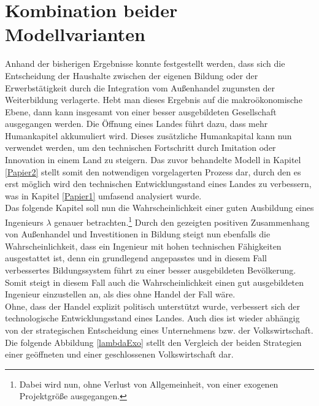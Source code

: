 \chapter{Kombination beider Modellvarianten}\label{Kombi}
Anhand der bisherigen Ergebnisse konnte festgestellt werden, dass sich die Entscheidung
der Haushalte zwischen der eigenen Bildung oder der Erwerbstätigkeit durch die Integration vom Außenhandel zugunsten der Weiterbildung verlagerte. Hebt man dieses Ergebnis auf die makroökonomische Ebene, dann kann insgesamt von einer besser ausgebildeten Gesellschaft ausgegangen werden. Die Öffnung eines Landes führt dazu, dass mehr Humankapitel akkumuliert wird. Dieses zusätzliche Humankapital kann nun verwendet werden, um den technischen Fortschritt durch Imitation oder Innovation in einem Land zu steigern. Das zuvor behandelte Modell in Kapitel \ref{Papier2} stellt somit den notwendigen vorgelagerten Prozess dar, durch den es erst möglich wird den technischen Entwicklungsstand eines Landes zu verbessern, was in Kapitel \ref{Papier1} umfasend analysiert wurde.\\
%
Das folgende Kapitel soll nun die Wahrscheinlichkeit einer guten Ausbildung eines Ingenieurs $\lambda$ genauer betrachten.\footnote{Dabei wird nun, ohne Verlust von Allgemeinheit, von einer exogenen Projektgröße ausgegangen.} Durch den gezeigten positiven Zusammenhang von Außenhandel und Investitionen in Bildung steigt nun ebenfalls die Wahrscheinlichkeit, dass ein Ingenieur mit hohen technischen Fähigkeiten ausgestattet ist, denn ein grundlegend angepasstes und in diesem Fall verbessertes Bildungssystem führt zu einer besser ausgebildeten Bevölkerung. Somit steigt in diesem Fall auch die Wahrscheinlichkeit einen gut ausgebildeten Ingenieur einzustellen an, als dies ohne Handel der Fall wäre.  \\
%
Ohne, dass der Handel explizit politisch unterstützt wurde, verbessert sich der technologische Entwicklungsstand eines Landes. Auch dies ist wieder abhängig von der strategischen Entscheidung eines Unternehmens bzw. der Volkswirtschaft. Die folgende Abbildung \ref{lambdaExo} stellt den Vergleich der beiden Strategien einer geöffneten und einer geschlossenen Volkswirtschaft dar.\\
%
